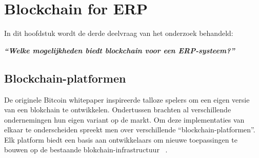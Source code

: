 \chapter{Blockchain for ERP}
\label{ch:blockchain-for-erp}

In dit hoofdstuk wordt de derde deelvraag van het onderzoek behandeld:

\begin{center}
	\textit{\textbf{``Welke mogelijkheden biedt blockchain voor een ERP-systeem?''}}
\end{center}


\section{Blockchain-platformen}

De originele Bitcoin whitepaper inspireerde talloze spelers om een eigen versie van een blokchain te ontwikkelen. Ondertussen brachten al verschillende ondernemingen hun eigen variant op de markt. Om deze implementaties van elkaar te onderscheiden spreekt men over verschillende ``blockchain-platformen''. Elk platform biedt een basis aan ontwikkelaars om nieuwe toepassingen te bouwen op de bestaande blokchain-infrastructuur
~\autocite{Saraf2018}.

